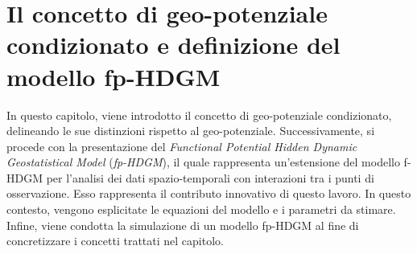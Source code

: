 \chapter[Il concetto di geo-potenziale condizionato e il modello fp-HDGM]{Il concetto di geo-potenziale condizionato e definizione del modello fp-HDGM}
In questo capitolo, viene introdotto il concetto di geo-potenziale condizionato, delineando le sue distinzioni rispetto al geo-potenziale. Successivamente, si procede con la presentazione del \textit{Functional Potential Hidden Dynamic Geostatistical Model} (\textit{fp-HDGM}), il quale rappresenta un'estensione del modello f-HDGM per l'analisi dei dati spazio-temporali con interazioni tra i punti di osservazione. Esso rappresenta il contributo innovativo di questo lavoro. In questo contesto, vengono esplicitate le equazioni del modello e i parametri da stimare. Infine, viene condotta la simulazione di un modello fp-HDGM al fine di concretizzare i concetti trattati nel capitolo.

